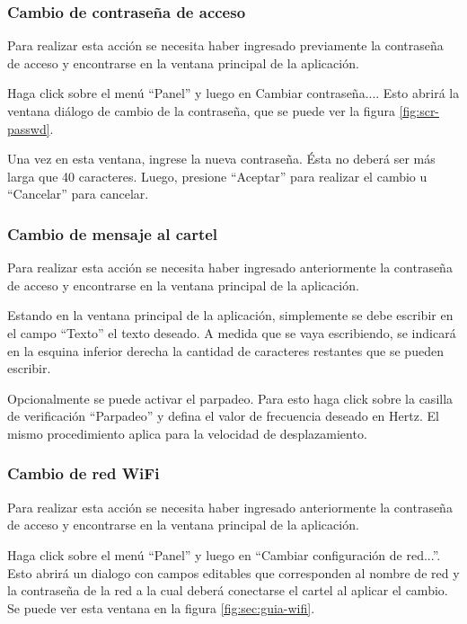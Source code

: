 \subsubsection{Cambio de contraseña de acceso}\label{sec:guia-password}
Para realizar esta acción se necesita haber ingresado previamente la contraseña de acceso y encontrarse en la ventana principal de la aplicación.

Haga click sobre el menú \enquote{Panel} y luego en {Cambiar contraseña...}. Esto abrirá la ventana diálogo de cambio de la contraseña, que se puede ver la figura \ref{fig:scr-passwd}.

Una vez en esta ventana, ingrese la nueva contraseña. Ésta no deberá ser más larga que 40 caracteres. %
Luego, presione \enquote{Aceptar} para realizar el cambio u \enquote{Cancelar} para cancelar.

\subsubsection{Cambio de mensaje al cartel}\label{sec:guia-texto}
Para realizar esta acción se necesita haber ingresado anteriormente la contraseña de acceso y encontrarse en la ventana principal de la aplicación.

Estando en la ventana principal de la aplicación, simplemente se debe escribir en el campo \enquote{Texto} el texto deseado. A medida que se vaya escribiendo, se indicará en la esquina inferior derecha la cantidad de caracteres restantes que se pueden escribir.

Opcionalmente se puede activar el parpadeo. Para esto haga click sobre la casilla de verificación \enquote{Parpadeo} y defina el valor de frecuencia deseado en Hertz. El mismo procedimiento aplica para la velocidad de desplazamiento.

\subsubsection{Cambio de red WiFi}\label{sec:guia-wifi}
Para realizar esta acción se necesita haber ingresado anteriormente la contraseña de acceso y encontrarse en la ventana principal de la aplicación.

Haga click sobre el menú \enquote{Panel} y luego en \enquote{Cambiar configuración de red...}. Esto abrirá un dialogo con campos editables que corresponden al nombre de red y la contraseña de la red a la cual deberá conectarse el cartel al aplicar el cambio. Se puede ver esta ventana en la figura \ref{fig:sec:guia-wifi}.

